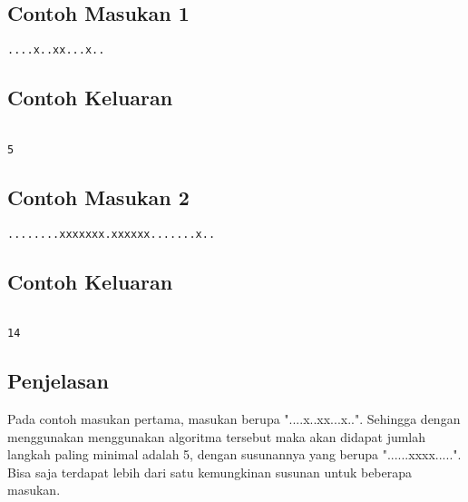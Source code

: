 \documentclass{article}
\begin{document}
\begin{multicols}{2}
\subsection*{Contoh Masukan 1}
\begin{lstlisting}
....x..xx...x..
\end{lstlisting}
\columnbreak
\subsection*{Contoh Keluaran}
\begin{lstlisting}

5
\end{lstlisting}
\vfill
\null
\end{multicols}
\begin{multicols}{2}
\subsection*{Contoh Masukan 2}
\begin{lstlisting}
........xxxxxxx.xxxxxx.......x..
\end{lstlisting}
\columnbreak
\subsection*{Contoh Keluaran}
\begin{lstlisting}

14
\end{lstlisting}
\vfill
\null
\end{multicols}

\subsection*{Penjelasan}
Pada contoh masukan pertama, masukan berupa "....x..xx...x..". Sehingga dengan menggunakan menggunakan algoritma tersebut maka akan didapat jumlah langkah paling minimal adalah 5, dengan susunannya yang berupa "......xxxx.....". Bisa saja terdapat lebih dari satu kemungkinan susunan untuk beberapa masukan.

\pagebreak
\end{document}
